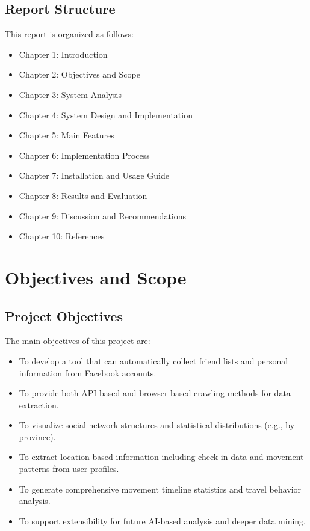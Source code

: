 \documentclass[13pt,a4paper]{report}
\begin{document}
\section{Report Structure}
This report is organized as follows:
\begin{itemize}
    \item Chapter 1: Introduction
    \item Chapter 2: Objectives and Scope
    \item Chapter 3: System Analysis
    \item Chapter 4: System Design and Implementation
    \item Chapter 5: Main Features
    \item Chapter 6: Implementation Process
    \item Chapter 7: Installation and Usage Guide
    \item Chapter 8: Results and Evaluation
    \item Chapter 9: Discussion and Recommendations
    \item Chapter 10: References
\end{itemize}

\chapter{Objectives and Scope}
\section{Project Objectives}
The main objectives of this project are:
\begin{itemize}
    \item To develop a tool that can automatically collect friend lists and personal information from Facebook accounts.
    \item To provide both API-based and browser-based crawling methods for data extraction.
    \item To visualize social network structures and statistical distributions (e.g., by province).
    \item To extract location-based information including check-in data and movement patterns from user profiles.
    \item To generate comprehensive movement timeline statistics and travel behavior analysis.
    \item To support extensibility for future AI-based analysis and deeper data mining.
\end{itemize}
\end{document}
